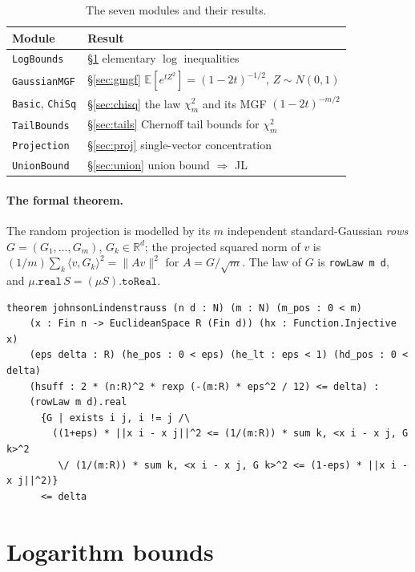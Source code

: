 \documentclass[11pt]{article}
\theoremstyle{remark}
\newcommand{\R}{\mathbb{R}}
\newcommand{\E}{\mathbb{E}}
\newcommand{\norm}[1]{\lVert #1 \rVert}
\begin{document}
\begin{table}[h]
\centering
\begin{tabular}{ll}
\hline
\textbf{Module} & \textbf{Result}\\
\hline
\texttt{LogBounds}   & \S\ref{sec:log} elementary $\log$ inequalities\\
\texttt{GaussianMGF} & \S\ref{sec:gmgf} $\E[e^{tZ^2}]=(1-2t)^{-1/2}$, $Z\sim N(0,1)$\\
\texttt{Basic}, \texttt{ChiSq} & \S\ref{sec:chisq} the law $\chi^2_m$ and its MGF $(1-2t)^{-m/2}$\\
\texttt{TailBounds}  & \S\ref{sec:tails} Chernoff tail bounds for $\chi^2_m$\\
\texttt{Projection}  & \S\ref{sec:proj} single-vector concentration\\
\texttt{UnionBound}  & \S\ref{sec:union} union bound $\Rightarrow$ JL\\
\hline
\end{tabular}
\caption{The seven modules and their results.}
\label{tab:modules}
\end{table}

\paragraph{The formal theorem.} The random projection is modelled by its $m$ independent
standard-Gaussian \emph{rows} $G=(G_1,\dots,G_m)$, $G_k\in\R^d$; the projected squared
norm of $v$ is $(1/m)\sum_k\langle v,G_k\rangle^2=\norm{Av}^2$ for $A=G/\sqrt m$. The law
of $G$ is \texttt{rowLaw m d}, and $\mu.\mathtt{real}\,S=(\mu S).\mathtt{toReal}$.

\begin{lstlisting}
theorem johnsonLindenstrauss (n d : N) (m : N) (m_pos : 0 < m)
    (x : Fin n -> EuclideanSpace R (Fin d)) (hx : Function.Injective x)
    (eps delta : R) (he_pos : 0 < eps) (he_lt : eps < 1) (hd_pos : 0 < delta)
    (hsuff : 2 * (n:R)^2 * rexp (-(m:R) * eps^2 / 12) <= delta) :
    (rowLaw m d).real
      {G | exists i j, i != j /\
        ((1+eps) * ||x i - x j||^2 <= (1/(m:R)) * sum k, <x i - x j, G k>^2
         \/ (1/(m:R)) * sum k, <x i - x j, G k>^2 <= (1-eps) * ||x i - x j||^2)}
      <= delta
\end{lstlisting}

\section{Logarithm bounds}\label{sec:log}
\end{document}

